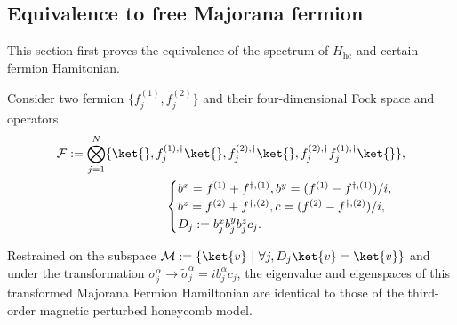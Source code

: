 \subsection{Equivalence to free Majorana fermion}
This section first proves the equivalence of the spectrum of $H_{\mathrm{hc}}$ and certain fermion Hamitonian.
\begin{theorem}\label{theo:equ_fermion}
      Consider two fermion $\{f_j^{(1)}, f_j^{(2)}\}$  and their four-dimensional Fock space and operators 
    \begin{align}
    \mathcal{F}:=\bigotimes_{j = 1}^N\{\ket{},f_j^{(1),\dagger}\ket{}, f_j^{(2),\dagger}\ket{}, f_j^{(2),\dagger} f_j^{(1),\dagger}\ket{}\},\\
         \begin{cases}b^x = f^{(1)}+f^{\dagger,(1)}, b^y = ( f^{(1)}-f^{\dagger,(1)})/i,\\b^z =f^{(2)}+f^{\dagger,(2)},c = ( f^{(2)}-f^{\dagger,(2)})/i,\\ D_j :=b_j^x b_j^y b_j^zc_j  .\end{cases}
    \end{align}
  
    Restrained on the subspace $\mathcal{M}:= \{\ket{v} ~|~\forall j, D_j\ket{v} =  \ket{v}\}$ and under the transformation $\sigma_j^{\alpha} \to \tilde{\sigma}_j^{\alpha}=i b_j^{\alpha}c_j$, the eigenvalue and eigenspaces of this transformed Majorana Fermion Hamiltonian are identical to those of the third-order magnetic perturbed honeycomb model.     
\end{theorem}
